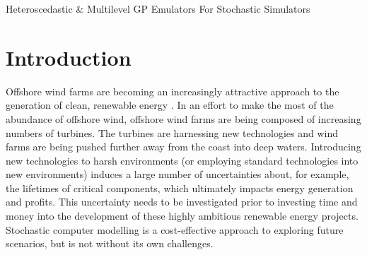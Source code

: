 \begin{chapter}{Heteroscedastic \& Multilevel GP Emulators For Stochastic Simulators\label{Ch:Hetsml}}
\section{Introduction}


Offshore wind farms are becoming an increasingly attractive approach to the generation of clean, renewable energy \citep{Hobley2019}. In an effort to make the most of the abundance of offshore wind, offshore wind farms are being composed of increasing numbers of turbines. The turbines are harnessing new technologies and wind farms are being pushed further away from the coast into deep waters. Introducing new technologies to harsh environments (or employing standard technologies into new environments) induces a large number of uncertainties about, for example, the lifetimes of critical components, which ultimately impacts energy generation and profits. This uncertainty needs to be investigated prior to investing time and money into the development of these highly ambitious renewable energy projects. Stochastic computer modelling is a cost-effective approach to exploring future scenarios, but is not without its own challenges.

\end{chapter}
